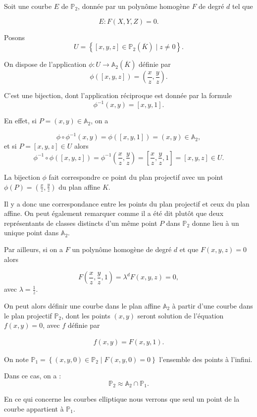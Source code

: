 Soit une courbe $E$ de $\mathbb{P}_{2}$, donnée par un
polynôme homogène $F$ de degré $d$ tel que 

\[
E : F(X,Y,Z)=0
.\] 

Posons 
\[
U = \left\{ [x,y,z] \in \mathbb{P}_{2}(\overline{K}) \mid z \neq 0 \right\} 
.\] 

On dispose de l'application $\phi : U \to \mathbb{A}_{2}(\overline{K})$ définie par
\[
\phi([x,y,z])=\left( \frac{x}{z},\frac{y}{z} \right) 
.\] 

C'est une bijection, dont l'application réciproque est donnée par la formule
\[
\phi^{-1}(x,y)=\left[ x,y,1 \right] 
.\] 

En effet, si $P = (x,y) \in \mathbb{A}_{2}$, on a

\[
\phi \circ \phi^{-1} (x,y) = \phi([x,y,1]) = (x,y) \in \mathbb{A}_{2}
,\] 
et si $P = [x,y,z] \in U$ alors
\[
\phi^{-1} \circ \phi ([x,y,z]) = \phi^{-1}(\frac{x}{z},\frac{y}{z}) = [\frac{x}{z},\frac{y}{z},1] =
[x,y,z] \in U
.\] 

La bijection $\phi$ fait correspondre ce point du plan projectif avec un point
$\phi(P) = (\frac{x}{z},\frac{y}{z})$ du plan affine $K$. 

Il y a donc une correspondance entre les points du plan projectif et ceux du plan affine.
On peut également remarquer comme il a été dit plutôt que deux représentants de classes
distincts d'un même point $P$ dans $\mathbb{P}_{2}$ donne lieu à un unique point dans
$\mathbb{A}_{2}$.

Par ailleurs, si on a $F$ un polynôme homogène de degré $d$ et que $F(x,y,z) = 0$ alors 

\[
F(\frac{x}{z},\frac{y}{z},1) = \lambda^{d} F(x,y,z) = 0
,\] 
avec $\lambda = \frac{1}{z}$.

On peut alors définir une courbe dans le plan affine $\mathbb{A}_{2}$ à partir d'une
courbe dans le plan projectif $\mathbb{P}_{2}$, dont les points $(x,y)$ seront solution de
l'équation $f(x,y) = 0$, avec $f$ définie par

\begin{align}
    \label{eq:bijectionP2}
    f(x,y) = F(x,y,1)
.\end{align}


On note $\mathbb{P}_{1} = \left\{ (x,y,0) \in \mathbb{P}_{2} \mid F(x,y,0) = 0 \right\} $
l'ensemble des points à l'infini.

Dans ce cas, on a :
\[
\mathbb{P}_{2} \approx \mathbb{A}_{2} \cap \mathbb{P}_{1}
.\] 


\begin{remarque}
    En ce qui concerne les courbes elliptique nous verrons que seul un point de la courbe
    appartient à $\mathbb{P}_{1}$.
\end{remarque}

